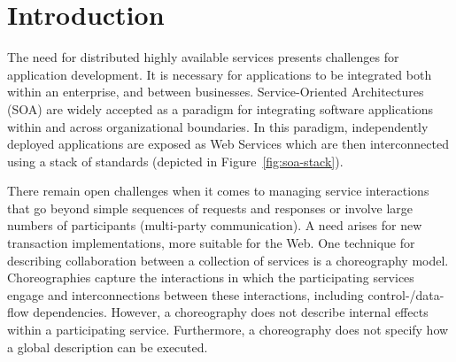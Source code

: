 \documentclass{llncs}
\begin{document}

%
%



\section{Introduction}
\label{sect:introduction}

The need for distributed highly available services presents challenges for application development.
It is necessary for applications to be integrated both within an enterprise, and between businesses.
Service-Oriented Architectures (SOA) are widely accepted as a paradigm for integrating software applications within and across organizational boundaries.
In this paradigm, independently deployed applications are exposed as Web Services which are then 
interconnected using a stack of standards (depicted in Figure~\ref{fig:soa-stack}). 
		
There remain open challenges when it comes to managing service interactions that go beyond simple sequences of requests and responses or involve large numbers of participants (multi-party communication). A need arises for new transaction implementations, more suitable for the Web.
One technique for describing collaboration between a collection of services is a choreography model.
Choreographies capture the interactions in which the participating services engage and interconnections between these interactions, including control-/data-flow dependencies.
However, a choreography does not describe internal effects within a participating service. Furthermore, a choreography does not specify how a global description can be executed.
\end{document}
